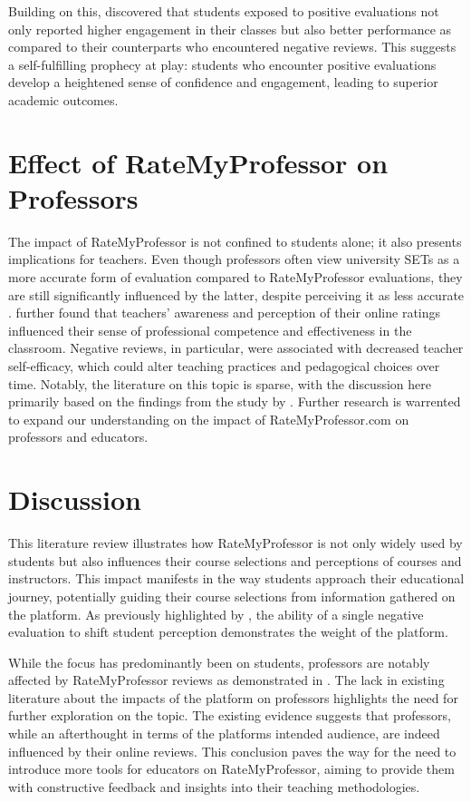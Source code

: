\documentclass[man,12pt]{apa7}
\begin{document}
Building on this, \textcite{reber_perceptual_2017} discovered that students exposed to positive evaluations not only reported higher engagement in their classes but also better performance as compared to their counterparts who encountered negative reviews. This suggests a self-fulfilling prophecy at play: students who encounter positive evaluations develop a heightened sense of confidence and engagement, leading to superior academic outcomes.

\section{Effect of RateMyProfessor on Professors}
The impact of RateMyProfessor is not confined to students alone; it also presents implications for teachers. Even though professors often view university SETs as a more accurate form of evaluation compared to RateMyProfessor evaluations, they are still significantly influenced by the latter, despite perceiving it as less accurate \textcite{boswell_ratemyprofessors_2016}. \textcite{boswell_ratemyprofessors_2016} further found that teachers' awareness and perception of their online ratings influenced their sense of professional competence and effectiveness in the classroom. Negative reviews, in particular, were associated with decreased teacher self-efficacy, which could alter teaching practices and pedagogical choices over time. Notably, the literature on this topic is sparse, with the discussion here primarily based on the findings from the study by \textcite{boswell_ratemyprofessors_2016}. Further research is warrented to expand our understanding on the impact of RateMyProfessor.com on professors and educators.

\section{Discussion}

This literature review illustrates how RateMyProfessor is not only widely used by students but also influences their course selections and perceptions of courses and instructors. This impact manifests in the way students approach their educational journey, potentially guiding their course selections from information gathered on the platform. As previously highlighted by \textcite{scherr_single_2013}, the ability of a single negative evaluation to shift student perception demonstrates the weight of the platform.

While the focus has predominantly been on students,  professors are notably affected by RateMyProfessor reviews as demonstrated in \textcite{boswell_ratemyprofessors_2016}. The lack in existing literature about the impacts of the platform on professors highlights the need for further exploration on the topic. The existing evidence suggests that professors, while an afterthought in terms of the platforms intended audience, are indeed influenced by their online reviews. This conclusion paves the way for the need to introduce more tools for educators on RateMyProfessor, aiming to provide them with constructive feedback and insights into their teaching methodologies.
\end{document}
